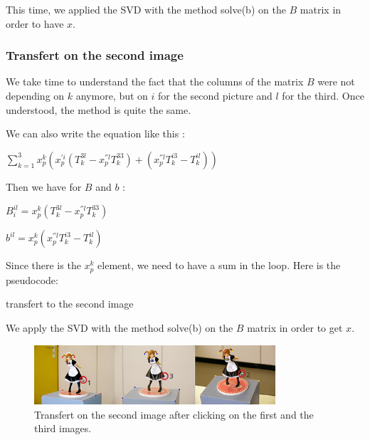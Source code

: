 \documentclass{report}
\begin{document}
This time, we applied the SVD with the method solve(b) on the $B$ matrix in order to have $x$. 

\subsubsection{Transfert on the second image}
We take time to understand the fact that the columns of the matrix $B$ were not depending on $k$ anymore, but on $i$ for the second picture and $l$ for the third. Once understood, the method is quite the same. 

We can also write the equation like this : 

\begin{center}
 $ \displaystyle { \sum_{k = 1}^{3}} x_{p}^{k}(x_{p}^{'i} (T_{k}^{3l} - x_{p}^{''l}T_{k}^{33}) + ( x_{p}^{''l}T_{k}^{i3} - T_{k}^{il} ))$
\end{center}

Then we have for $B$ and $b$ :  
\begin{center}
$B_{i}^{il} = x_{p}^{k}(T_{k}^{3l} - x_{p}^{''l}T_{k}^{33})$
\end{center}
\begin{center}
$b^{il} = x_{p}^{k}(x_{p}^{''l}T_{k}^{i3} - T_{k}^{il})$
\end{center}

Since there is the $x_{p}^{k}$ element, we need to have a sum in the loop. Here is the pseudocode:

\begin{algorithm}
\SetLine
\caption{transfert to the second image}
\SetLine
{}
\end{algorithm}
We apply the SVD with the method solve(b) on the $B$ matrix in order to get $x$.

\newpage 
\begin{figure}[ht]
   \begin{center}
	\includegraphics[width=0.8\textwidth]{Tenseur.png}
	\caption{Transfert on the second image after clicking on the first and the third images.}
	\label{fig:mon image}
	\end{center}
\end{figure}
\end{document}
